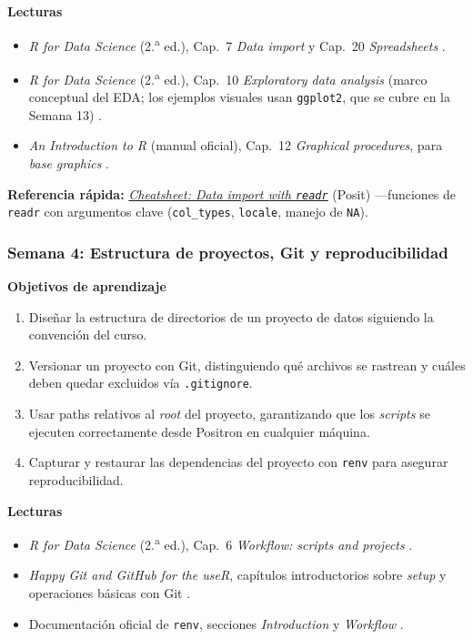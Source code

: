 \documentclass[11pt,letterpaper]{article}
\newcommand{\semana}[2]{%
  \subsubsection*{\color{main}Semana #1: #2}%
}
\newcommand{\cheatsheet}[2]{%
  \href{https://rstudio.github.io/cheatsheets/#1.pdf}{\textit{Cheatsheet: #2}}%
}
\begin{document}
\medskip
\noindent\textbf{Lecturas}
\begin{itemize}[leftmargin=*, itemsep=1pt]
    \item \textit{R for Data Science} (2.\textsuperscript{a} ed.), Cap.\ 7 \textit{Data import} y Cap.\ 20 \textit{Spreadsheets} \cite{wickham2023r4ds}.
    \item \textit{R for Data Science} (2.\textsuperscript{a} ed.), Cap.\ 10 \textit{Exploratory data analysis} (marco conceptual del EDA; los ejemplos visuales usan \texttt{ggplot2}, que se cubre en la Semana 13) \cite{wickham2023r4ds}.
    \item \textit{An Introduction to R} (manual oficial), Cap.\ 12 \textit{Graphical procedures}, para \textit{base graphics} \cite{rcoreteam-intro}.
\end{itemize}

\medskip
\noindent\textbf{Referencia rápida:} \cheatsheet{data-import}{Data import with \texttt{readr}} (Posit) ---funciones de \texttt{readr} con argumentos clave (\texttt{col\_types}, \texttt{locale}, manejo de \texttt{NA}).

\semana{4}{Estructura de proyectos, Git y reproducibilidad}

\medskip
\noindent\textbf{Objetivos de aprendizaje}
\begin{enumerate}[leftmargin=*, itemsep=1pt]
    \item Diseñar la estructura de directorios de un proyecto de datos siguiendo la convención del curso.
    \item Versionar un proyecto con Git, distinguiendo qué archivos se rastrean y cuáles deben quedar excluidos vía \texttt{.gitignore}.
    \item Usar paths relativos al \textit{root} del proyecto, garantizando que los \textit{scripts} se ejecuten correctamente desde Positron en cualquier máquina.
    \item Capturar y restaurar las dependencias del proyecto con \texttt{renv} para asegurar reproducibilidad.
\end{enumerate}

\medskip
\noindent\textbf{Lecturas}
\begin{itemize}[leftmargin=*, itemsep=1pt]
    \item \textit{R for Data Science} (2.\textsuperscript{a} ed.), Cap.\ 6 \textit{Workflow: scripts and projects} \cite{wickham2023r4ds}.
    \item \textit{Happy Git and GitHub for the useR}, capítulos introductorios sobre \textit{setup} y operaciones básicas con Git \cite{bryan-happygit}.
    \item Documentación oficial de \texttt{renv}, secciones \textit{Introduction} y \textit{Workflow} \cite{ushey-renv}.
\end{itemize}
\end{document}
